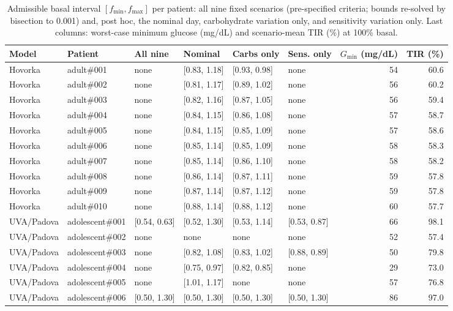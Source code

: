 \begin{table}[H]
\centering
\caption{Admissible basal interval $[f_{\min},f_{\max}]$ per patient: all nine fixed scenarios (pre-specified criteria; bounds re-solved by bisection to 0.001) and, post hoc, the nominal day, carbohydrate variation only, and sensitivity variation only. Last columns: worst-case minimum glucose (mg/dL) and scenario-mean TIR (\%) at 100\% basal.}\label{tab:S4}
\scriptsize
\begin{tabular}{llllllrr}
\toprule
Model & Patient & All nine & Nominal & Carbs only & Sens. only & $G_{\min}$ (mg/dL) & TIR (\%) \\
\midrule
Hovorka & adult\#001 & none & [0.83, 1.18] & [0.93, 0.98] & none & 54 & 60.6 \\
Hovorka & adult\#002 & none & [0.81, 1.17] & [0.89, 1.02] & none & 56 & 60.2 \\
Hovorka & adult\#003 & none & [0.82, 1.16] & [0.87, 1.05] & none & 56 & 59.4 \\
Hovorka & adult\#004 & none & [0.84, 1.15] & [0.86, 1.08] & none & 57 & 58.7 \\
Hovorka & adult\#005 & none & [0.84, 1.15] & [0.85, 1.09] & none & 57 & 58.6 \\
Hovorka & adult\#006 & none & [0.85, 1.14] & [0.85, 1.09] & none & 58 & 58.3 \\
Hovorka & adult\#007 & none & [0.85, 1.14] & [0.86, 1.10] & none & 58 & 58.2 \\
Hovorka & adult\#008 & none & [0.86, 1.14] & [0.87, 1.11] & none & 59 & 57.8 \\
Hovorka & adult\#009 & none & [0.87, 1.14] & [0.87, 1.12] & none & 59 & 57.8 \\
Hovorka & adult\#010 & none & [0.88, 1.14] & [0.88, 1.12] & none & 60 & 57.7 \\
UVA/Padova & adolescent\#001 & [0.54, 0.63] & [0.52, 1.30] & [0.53, 1.14] & [0.53, 0.87] & 66 & 98.1 \\
UVA/Padova & adolescent\#002 & none & none & none & none & 52 & 57.4 \\
UVA/Padova & adolescent\#003 & none & [0.82, 1.08] & [0.83, 1.02] & [0.88, 0.89] & 50 & 79.8 \\
UVA/Padova & adolescent\#004 & none & [0.75, 0.97] & [0.82, 0.85] & none & 29 & 73.0 \\
UVA/Padova & adolescent\#005 & none & [1.01, 1.17] & none & none & 57 & 76.8 \\
UVA/Padova & adolescent\#006 & [0.50, 1.30] & [0.50, 1.30] & [0.50, 1.30] & [0.50, 1.30] & 86 & 97.0 \\

\end{tabular}
\end{table}
